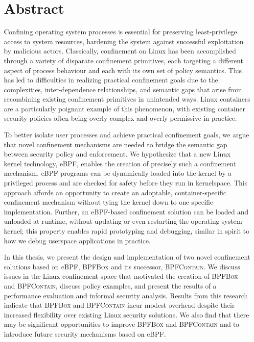 \documentclass[
  fontsize=12pt,
  titlepage=firstiscover,
  paper=letter,
  oneside,
  cleardoublepage=plain,
  parskip=half-,
  DIV=10,
  parindent,
  appendixprefix,
  chapterprefix,
  listof=totoc,
]{scrbook}
\newcommand{\bpfbox}{\textsc{BPFBox}}
\newcommand{\bpfcontain}{\textsc{BPFContain}}
\begin{document}
\chapter*{Abstract}%
%
\begingroup
\small
Confining operating system processes is essential for preserving least-privilege
access to system resources, hardening the system against successful exploitation
by malicious actors. Classically, confinement on Linux has been accomplished
through a variety of disparate confinement primitives, each targeting a
different aspect of process behaviour and each with its own set of policy
semantics. This has led to difficulties in realizing practical confinement goals
due to the complexities, inter-dependence relationships, and semantic gaps that
arise from recombining existing confinement primitives in unintended ways. Linux
containers are a particularly poignant example of this phenomenon, with existing
container security policies often being overly complex and overly permissive in
practice.

To better isolate user processes and achieve practical confinement goals, we
argue that novel confinement mechanisms are needed to bridge the semantic gap
between security policy and enforcement. We hypothesize that a new Linux kernel
technology, eBPF, enables the creation of precisely such a confinement
mechanism. eBPF programs can be dynamically loaded into the kernel by a
privileged process and are checked for safety before they run in kernelspace.
This approach affords an opportunity to create an adoptable, container-specific
confinement mechanism without tying the kernel down to one specific
implementation.  Further, an eBPF-based confinement solution can be loaded and
unloaded at runtime, without updating or even restarting the operating system
kernel; this property enables rapid prototyping and debugging, similar in spirit
to how we debug userspace applications in practice.

In this thesis, we present the design and implementation of two novel
confinement solutions based on eBPF, \bpfbox{} and its successor, \bpfcontain{}.
We discuss issues in the Linux confinement space that motivated the creation of
\bpfbox{} and \bpfcontain{}, discuss policy examples, and present the results of
a performance evaluation and informal security analysis. Results from this
research indicate that \bpfbox{} and \bpfcontain{} incur modest overhead despite
their increased flexibility over existing Linux security solutions.  We also
find that there may be significant opportunities to improve \bpfbox{} and
\bpfcontain{} and to introduce future security mechanisms based on eBPF\@.
\end{document}
